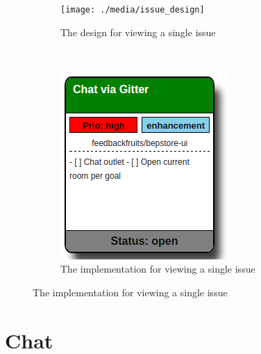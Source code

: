 \begin{figure}[ht!]
    \centering
    \begin{subfigure}[b]{0.45\textwidth}
        \centering
        \texttt{[image: ./media/issue\_design]}
        \caption{The design for viewing a single issue}
        \label{fig:issue-design}
    \end{subfigure}
    ~
    \begin{subfigure}[b]{0.45\textwidth}
        \includegraphics[width=\textwidth]{./media/issue_implementation}
        \caption{The implementation for viewing a single issue}
        \label{fig:issue-implementation}
    \end{subfigure}
\end{figure}

\section{Chat}

